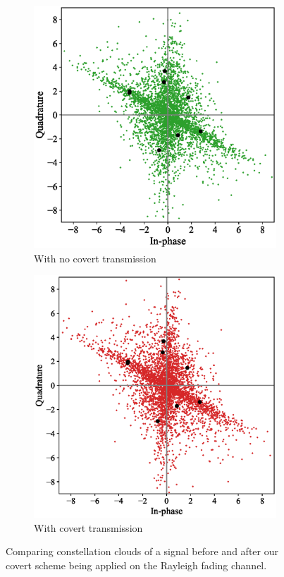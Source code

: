 \begin{figure}[tp!]
	\begin{subfigure}{0.24\textwidth}
		\includegraphics[width=\linewidth]{figs/rayleigh_normal_constellation}
		\caption{With no covert transmission}
	\end{subfigure}
	\hfill
	\begin{subfigure}{0.24\textwidth}
		\includegraphics[width=\linewidth]{figs/rayleigh_covert_constellation}
		\caption{With covert transmission}	
	\end{subfigure}
	\caption{Comparing constellation clouds of a signal before and after our covert scheme being applied on the Rayleigh fading channel.}
	\label{fig:rayleigh_constellation}
\end{figure}
